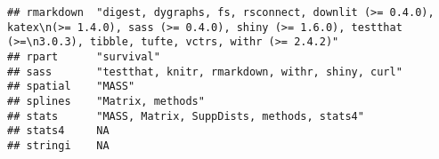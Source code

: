 \documentclass[
]{article}
\begin{document}
\begin{verbatim}
## rmarkdown  "digest, dygraphs, fs, rsconnect, downlit (>= 0.4.0), katex\n(>= 1.4.0), sass (>= 0.4.0), shiny (>= 1.6.0), testthat (>=\n3.0.3), tibble, tufte, vctrs, withr (>= 2.4.2)"                                                                                                                                                                          
## rpart      "survival"                                                                                                                                                                                                                                                                                                                                         
## sass       "testthat, knitr, rmarkdown, withr, shiny, curl"                                                                                                                                                                                                                                                                                                   
## spatial    "MASS"                                                                                                                                                                                                                                                                                                                                             
## splines    "Matrix, methods"                                                                                                                                                                                                                                                                                                                                  
## stats      "MASS, Matrix, SuppDists, methods, stats4"                                                                                                                                                                                                                                                                                                         
## stats4     NA                                                                                                                                                                                                                                                                                                                                                 
## stringi    NA                                                                                                                                                                                                                                                                                                                                                 

\end{verbatim}
\end{document}
